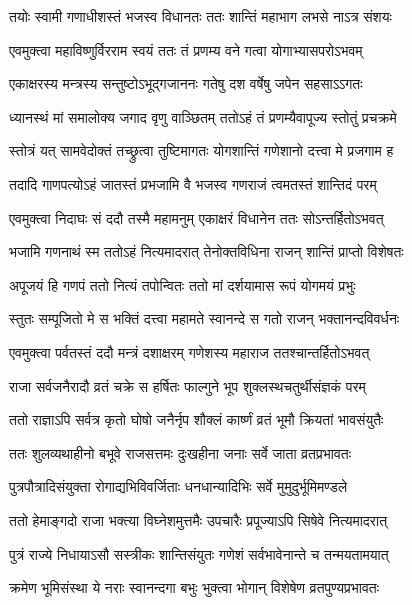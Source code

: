 \twolineshloka
{तयोः स्वामी गणाधीशस्तं भजस्व विधानतः}
{ततः शान्तिं महाभाग लभसे नाऽत्र संशयः} %

\twolineshloka
{एवमुक्त्वा महाविष्णुर्विरराम स्वयं ततः}
{तं प्रणम्य वने गत्वा योगाभ्यासपरोऽभवम्} %

\twolineshloka
{एकाक्षरस्य मन्त्रस्य सन्तुष्टोऽभूद्गजाननः}
{गतेषु दश वर्षेषु जपेन सहसाऽऽगतः} %

\twolineshloka
{ध्यानस्थं मां समालोक्य जगाद वृणु वाञ्छितम्}
{ततोऽहं तं प्रणम्यैवापूज्य स्तोतुं प्रचक्रमे} %

\twolineshloka
{स्तोत्रं यत् सामवेदोक्तं तच्छ्रुत्वा तुष्टिमागतः}
{योगशान्तिं गणेशानो दत्त्वा मे प्रजगाम ह} %

\twolineshloka
{तदादि गाणपत्योऽहं जातस्तं प्रभजामि वै}
{भजस्व गणराजं त्वमतस्तं शान्तिदं परम्} %

\twolineshloka
{एवमुक्त्वा निदाघः सं ददौ तस्मै महामनुम्}
{एकाक्षरं विधानेन ततः सोऽन्तर्हितोऽभवत्} %


\twolineshloka
{भजामि गणनाथं स्म ततोऽहं नित्यमादरात्}
{तेनोक्तविधिना राजन् शान्तिं प्राप्तो विशेषतः} %

\twolineshloka
{अपूजयं हि गणपं ततो नित्यं तपोन्वितः}
{ततो मां दर्शयामास रूपं योगमयं प्रभुः} %

\twolineshloka
{स्तुतः सम्पूजितो मे स भक्तिं दत्त्वा महामते}
{स्वानन्दे स गतो राजन् भक्तानन्दविवर्धनः} %

\twolineshloka
{एवमुक्त्वा पर्वतस्तं ददौ मन्त्रं दशाक्षरम्}
{गणेशस्य महाराज ततश्चान्तर्हितोऽभवत्} %

\twolineshloka
{राजा सर्वजनैरादौ व्रतं चक्रे स हर्षितः}
{फाल्गुने भूप शुक्लस्थचतुर्थीसंज्ञकं परम्} %

\twolineshloka
{ततो राज्ञाऽपि सर्वत्र कृतो घोषो जनैर्नृप}
{शौक्लं कार्ष्णं व्रतं भूमौ क्रियतां भावसंयुतैः} %

\twolineshloka
{ततः शुलव्यथाहीनो बभूवे राजसत्तमः}
{दुःखहीना जनाः सर्वे जाता व्रतप्रभावतः} %

\twolineshloka
{पुत्रपौत्रादिसंयुक्ता रोगाद्यभिविवर्जिताः}
{धनधान्यादिभिः सर्वे मुमुदुर्भूमिमण्डले} %

\twolineshloka
{ततो हेमाङ्गदो राजा भक्त्या विघ्नेशमुत्तमैः}
{उपचारैः प्रपूज्याऽपि सिषेवे नित्यमादरात्} %

\twolineshloka
{पुत्रं राज्ये निधायाऽसौ सस्त्रीकः शान्तिसंयुतः}
{गणेशं सर्वभावेनान्ते च तन्मयतामयात्} %

\twolineshloka
{क्रमेण भूमिसंस्था ये नराः स्वानन्दगा बभुः}
{भुक्त्वा भोगान् विशेषेण व्रतपुण्यप्रभावतः} %

